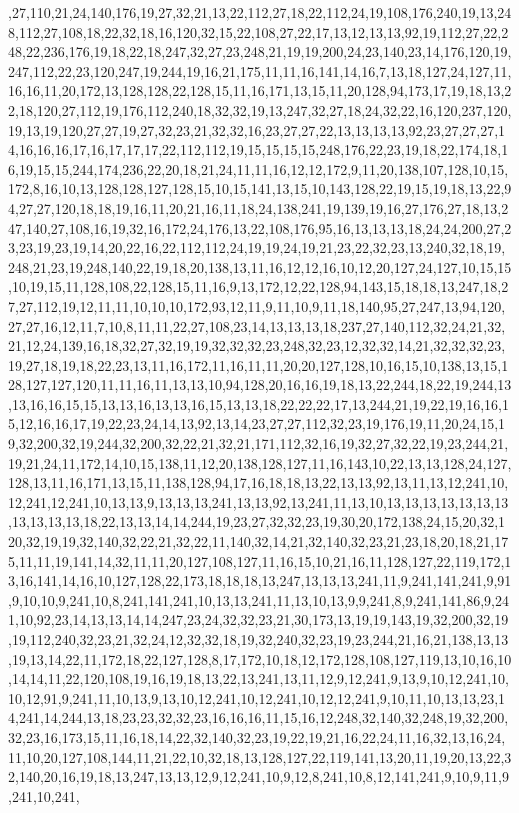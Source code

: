 ,27,110,21,24,140,176,19,27,32,21,13,22,112,27,18,22,112,24,19,108,176,240,19,13,248,112,27,108,18,22,32,18,16,120,32,15,22,108,27,22,17,13,12,13,13,92,19,112,27,22,248,22,236,176,19,18,22,18,247,32,27,23,248,21,19,19,200,24,23,140,23,14,176,120,19,247,112,22,23,120,247,19,244,19,16,21,175,11,11,16,141,14,16,7,13,18,127,24,127,11,16,16,11,20,172,13,128,128,22,128,15,11,16,171,13,15,11,20,128,94,173,17,19,18,13,22,18,120,27,112,19,176,112,240,18,32,32,19,13,247,32,27,18,24,32,22,16,120,237,120,19,13,19,120,27,27,19,27,32,23,21,32,32,16,23,27,27,22,13,13,13,13,92,23,27,27,27,14,16,16,16,17,16,17,17,17,22,112,112,19,15,15,15,15,248,176,22,23,19,18,22,174,18,16,19,15,15,244,174,236,22,20,18,21,24,11,11,16,12,12,172,9,11,20,138,107,128,10,15,172,8,16,10,13,128,128,127,128,15,10,15,141,13,15,10,143,128,22,19,15,19,18,13,22,94,27,27,120,18,18,19,16,11,20,21,16,11,18,24,138,241,19,139,19,16,27,176,27,18,13,247,140,27,108,16,19,32,16,172,24,176,13,22,108,176,95,16,13,13,13,18,24,24,200,27,23,23,19,23,19,14,20,22,16,22,112,112,24,19,19,24,19,21,23,22,32,23,13,240,32,18,19,248,21,23,19,248,140,22,19,18,20,138,13,11,16,12,12,16,10,12,20,127,24,127,10,15,15,10,19,15,11,128,108,22,128,15,11,16,9,13,172,12,22,128,94,143,15,18,18,13,247,18,27,27,112,19,12,11,11,10,10,10,172,93,12,11,9,11,10,9,11,18,140,95,27,247,13,94,120,27,27,16,12,11,7,10,8,11,11,22,27,108,23,14,13,13,13,18,237,27,140,112,32,24,21,32,21,12,24,139,16,18,32,27,32,19,19,32,32,32,23,248,32,23,12,32,32,14,21,32,32,32,23,19,27,18,19,18,22,23,13,11,16,172,11,16,11,11,20,20,127,128,10,16,15,10,138,13,15,128,127,127,120,11,11,16,11,13,13,10,94,128,20,16,16,19,18,13,22,244,18,22,19,244,13,13,16,16,15,15,13,13,16,13,13,16,15,13,13,18,22,22,22,17,13,244,21,19,22,19,16,16,15,12,16,16,17,19,22,23,24,14,13,92,13,14,23,27,27,112,32,23,19,176,19,11,20,24,15,19,32,200,32,19,244,32,200,32,22,21,32,21,171,112,32,16,19,32,27,32,22,19,23,244,21,19,21,24,11,172,14,10,15,138,11,12,20,138,128,127,11,16,143,10,22,13,13,128,24,127,128,13,11,16,171,13,15,11,138,128,94,17,16,18,18,13,22,13,13,92,13,11,13,12,241,10,12,241,12,241,10,13,13,9,13,13,13,241,13,13,92,13,241,11,13,10,13,13,13,13,13,13,13,13,13,13,13,18,22,13,13,14,14,244,19,23,27,32,32,23,19,30,20,172,138,24,15,20,32,120,32,19,19,32,140,32,22,21,32,22,11,140,32,14,21,32,140,32,23,21,23,18,20,18,21,175,11,11,19,141,14,32,11,11,20,127,108,127,11,16,15,10,21,16,11,128,127,22,119,172,13,16,141,14,16,10,127,128,22,173,18,18,18,13,247,13,13,13,241,11,9,241,141,241,9,91,9,10,10,9,241,10,8,241,141,241,10,13,13,241,11,13,10,13,9,9,241,8,9,241,141,86,9,241,10,92,23,14,13,13,14,14,247,23,24,32,32,23,21,30,173,13,19,19,143,19,32,200,32,19,19,112,240,32,23,21,32,24,12,32,32,18,19,32,240,32,23,19,23,244,21,16,21,138,13,13,19,13,14,22,11,172,18,22,127,128,8,17,172,10,18,12,172,128,108,127,119,13,10,16,10,14,14,11,22,120,108,19,16,19,18,13,22,13,241,13,11,12,9,12,241,9,13,9,10,12,241,10,10,12,91,9,241,11,10,13,9,13,10,12,241,10,12,241,10,12,12,241,9,10,11,10,13,13,23,14,241,14,244,13,18,23,23,32,32,23,16,16,16,11,15,16,12,248,32,140,32,248,19,32,200,32,23,16,173,15,11,16,18,14,22,32,140,32,23,19,22,19,21,16,22,24,11,16,32,13,16,24,11,10,20,127,108,144,11,21,22,10,32,18,13,128,127,22,119,141,13,20,11,19,20,13,22,32,140,20,16,19,18,13,247,13,13,12,9,12,241,10,9,12,8,241,10,8,12,141,241,9,10,9,11,9,241,10,241,